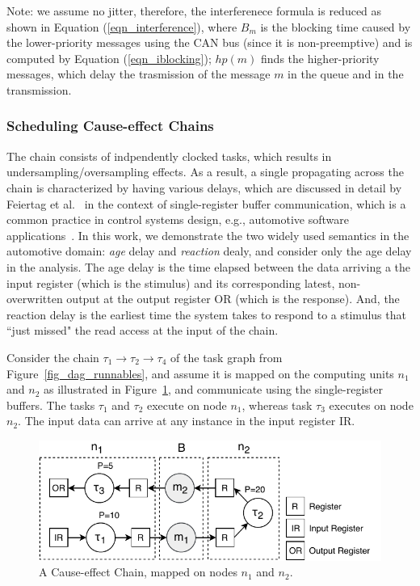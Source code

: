 Note: we assume no jitter, therefore, the interferenece formula is reduced as shown in Equation (\ref{eqn_interference}), where $B_m$ is the blocking time caused by the lower-priority messages using the CAN bus (since it is non-preemptive) and is computed by Equation (\ref{eqn_iblocking}); $hp(m)$ finds the higher-priority messages, which delay the trasmission of the message $m$ in the queue and in the transmission.

\subsubsection{Scheduling Cause-effect Chains}\label{subsec_cause-effect_chains}
The chain consists of indpendently clocked tasks, which results in undersampling/oversampling effects. As a result, a single propagating across the chain is characterized by having various delays, which are discussed in detail by Feiertag et al.~\cite{Feiertag2009ASemantics} in the context of single-register buffer communication,  which is a common practice in control systems design, e.g., automotive software applications~\cite{Becker2017End-to-endSystems}. In this work, we demonstrate the two widely used semantics in the automotive domain: \textit{age} delay and \textit{reaction} dealy, and consider only the age delay in the analysis. The age delay is the time elapsed between the data arriving a the input register (which is the stimulus) and its corresponding latest, non-overwritten output at the output register {\sffamily OR} (which is the response). And, the reaction delay is the earliest time the system takes to respond to a stimulus that ``just missed" the read access at the input of the chain.

Consider the chain $\tau_1\rightarrow \tau_2\rightarrow \tau_4$ of the task graph from Figure~\ref{fig_dag_runnables}, and assume it is mapped on the computing units $n_1$ and $n_2$ as illustrated in Figure~\ref{fig_cause_effect_chain}, and communicate using the single-register buffers. The tasks $\tau_1$ and $\tau_2$ execute on node $n_1$, whereas task $\tau_3$ executes on node $n_2$. The input data can arrive at any instance in the input register {\sffamily IR}. 
\begin{figure}
	\centering
	\includegraphics[width=0.7\linewidth]{img/cause_effect_chain_ntk}
	\caption{A Cause-effect Chain, mapped on nodes $n_1$ and $n_2$.}
	\label{fig_cause_effect_chain}
\end{figure}

